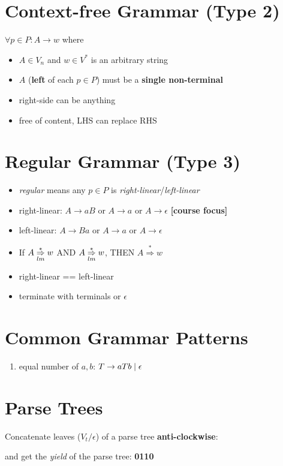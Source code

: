 \documentclass[10pt,a4paper,fleqn,landscape]{article}
\begin{document}
\begin{multicols*}{3}
\section*{Context-free Grammar (Type 2)}
\(\forall p \in P: A \rightarrow w\) where
\begin{itemize}
\item \(A \in V_{n}\) and \(w \in V^{*}\) is an arbitrary string
\item \(A\) (\textbf{left} of each \(p \in P\)) must be a \textbf{single non-terminal}
\item right-side can be anything
\item free of content, LHS can replace RHS
\end{itemize}
\section*{Regular Grammar (Type 3)}
\begin{itemize}
\item \emph{regular} means any \(p \in P\) is \emph{right-linear}/\emph{left-linear}
\item right-linear: \(A \rightarrow aB\) or \(A \rightarrow a\) or \(A \rightarrow \epsilon\) \textbf{[course focus]}
\item left-linear: \(A \rightarrow Ba\) or \(A \rightarrow a\) or \(A \rightarrow \epsilon\)
\item If \(A \overset{*}{\underset{lm}{\Rightarrow}} w\) AND \(A \overset{*}{\underset{lm}{\Rightarrow}} w\), THEN \(A \overset{*}{\Rightarrow} w\)
\item right-linear == left-linear
\item terminate with terminals or \(\epsilon\)
\end{itemize}
\section*{Common Grammar Patterns}
\begin{enumerate}
\item equal number of \(a, b\): \(T \rightarrow aTb \;|\; \epsilon\)
\end{enumerate}
\section*{Parse Trees}
Concatenate leaves (\(V_{t}/\epsilon\)) of a parse tree \textbf{anti-clockwise}:
and get the \emph{yield} of the parse tree: \textbf{0110}

\end{multicols*}
\end{document}
